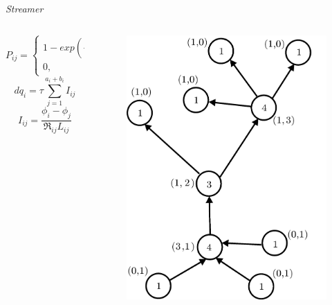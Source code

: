 \documentclass{beamer}
\begin{document}
\begin{frame}{\textit{Streamer}}
	\begin{columns}
		\begin{column}{0.5\textwidth}
			\begin{equation}
				P_{ij} = \begin{cases}
					1 - exp \left( -\left| \frac{E_{ij} - E_i}{E_s - E_i} \right|^m\right ), &  E_{ij} \geq E_i \\ 
					0, & E_{ij} < E_i 
				\end{cases}
				\label{eqn_1}
			\end{equation}
			\begin{equation}
				dq_i = \tau \sum_{j=1}^{a_i + b_i} I_{ij} 
				\label{eqn_2}
			\end{equation}
			\begin{equation}
				I_{ij} = \frac{\phi_i - \phi_j}{\Re_{ij} L_{ij}}
				\label{eqn_3}
			\end{equation}
		\end{column}
		\begin{column}{0.5\textwidth}
			\begin{figure}
				\includegraphics[height=0.8\textheight]{imagens_artigo/6.png}
			\end{figure}
		\end{column}
	\end{columns}
\end{frame}
\end{document}
